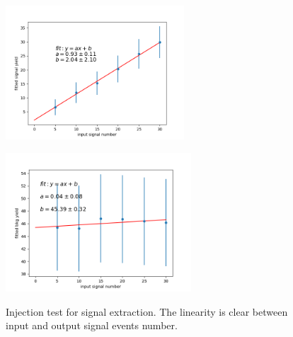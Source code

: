 \begin{figure}[H]
	\begin{minipage}[b]{0.5\linewidth}
		\centering 
		\includegraphics[height=5cm]{figures/inject_line_sig}
		\label{}
	\end{minipage}
	\begin{minipage}[b]{0.5\linewidth}
		\centering 
		\includegraphics[height=5.2cm]{figures/inject_line_bkg}
		\label{}
	\end{minipage}
	\caption{Injection test for signal extraction. The linearity is clear between input and output signal events number.}
\end{figure}

